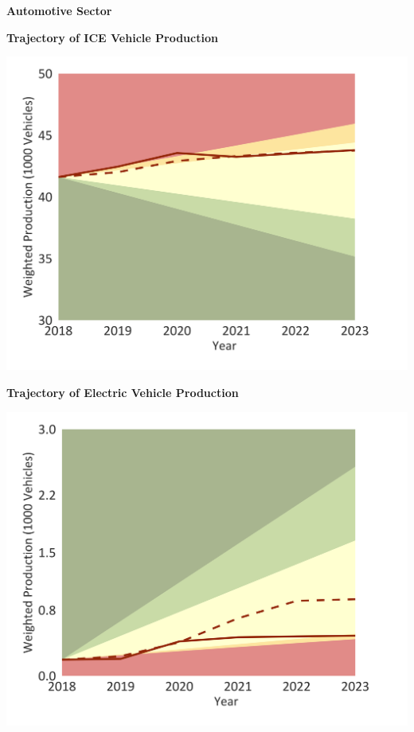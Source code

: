 \documentclass[10pt,table,a4]{article}\usepackage[]{graphicx}\usepackage[]{color}
\begin{document}
	
	\begin{center}
		\textbf{Automotive Sector}
	\end{center}
	
	\begin{minipage}[t]{.49\linewidth}
		\textbf{Trajectory of ICE Vehicle Production}
		
		\includegraphics[trim = {0 0cm 0 0},width=1\linewidth]{CAFigures/Fig24}
		
	\end{minipage}	
	\hspace{.02\linewidth}
	\begin{minipage}[t]{.49\textwidth}
		\textbf{Trajectory of Electric Vehicle Production}
		
		\includegraphics[trim = {0 0cm 0 0},width=1\linewidth]{CAFigures/Fig25}
		
	\end{minipage}		
	
\end{document}
